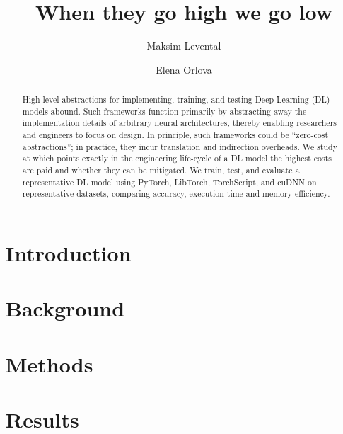 \documentclass[sigconf]{acmart}
\begin{document}
\title{When they go high we go low}

\author{Maksim Levental}
\author{Elena Orlova}

\renewcommand{\shortauthors}{Levental and Orlova}

\begin{abstract}
  High level abstractions for implementing, training, and testing Deep Learning (DL) models abound.
  Such frameworks function primarily by abstracting away the implementation details of arbitrary neural architectures, thereby enabling researchers and engineers to focus on design.
  In principle, such frameworks could be ``zero-cost abstractions'';
  in practice, they incur translation and indirection overheads.
  We study at which points exactly in the engineering life-cycle of a DL model the highest costs are paid and whether they can be mitigated.
  We train, test, and evaluate a representative DL model using PyTorch, LibTorch, TorchScript, and cuDNN on representative datasets, comparing accuracy, execution time and memory efficiency.
\end{abstract}


\maketitle

\section{Introduction}\label{sec:introduction}


\section{Background}\label{sec:background}


\section{Methods}\label{sec:methodology}


\section{Results}\label{sec:results}

\end{document}
